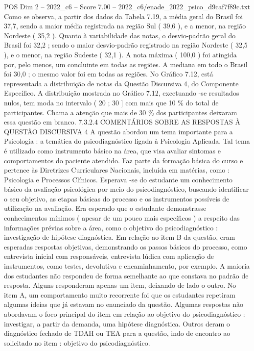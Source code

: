 \begin{textsample}{POS Dim 2 – 2022\_c6 – Score 7.00 – 2022\_c6/enade\_2022\_psico\_d9caf7f89c.txt}
Como se observa, a partir dos dados da Tabela 7.19, a média geral do Brasil foi 37,7, sendo a maior média registrada na região Sul ( 39,6 ), e a menor, na região Nordeste ( 35,2 ).
Quanto à variabilidade das notas, o desvio-padrão geral do Brasil foi 32,2 ; sendo o maior desvio-padrão registrado na região Nordeste ( 32,5 ), e o menor, na região Sudeste ( 32,1 ).
A nota máxima ( 100,0 ) foi atingida por, pelo menos, um concluinte em todas as regiões.
A mediana em todo o Brasil foi 30,0 ; o mesmo valor foi em todas as regiões.
No Gráfico 7.12, está representada a distribuição de notas da Questão Discursiva 4, do Componente Específico.
A distribuição mostrada no Gráfico 7.12, excetuando -se resultados nulos, tem moda no intervalo ( 20 ; 30 ] com mais que 10 \% do total de participantes.
Chama a atenção que mais de 30 \% dos participantes deixaram essa questão em branco. 7.3.2.4 COMENTÁRIOS SOBRE AS RESPOSTAS À QUESTÃO DISCURSIVA 4 A questão abordou um tema importante para a Psicologia : a temática do psicodiagnóstico ligada à Psicologia Aplicada.
Tal tema é utilizado como instrumento básico na área, que visa avaliar sintomas e comportamentos do paciente atendido.
Faz parte da formação básica do curso e pertence às Diretrizes Curriculares Nacionais, incluída em matérias, como : Psicologia e Processos Clínicos.
Esperava -se do estudante um conhecimento básico da avaliação psicológica por meio do psicodiagnóstico, buscando identificar o seu objetivo, as etapas básicas do processo e os instrumentos possíveis de utilização na avaliação.
Era esperado que o estudante demonstrasse conhecimentos mínimos ( apesar de um pouco mais específicos ) a respeito das informações prévias sobre a área, como o objetivo do psicodiagnóstico : investigação de hipótese diagnóstica.
Em relação ao item B da questão, eram esperadas respostas objetivas, demonstrando os passos básicos do processo, como entrevista inicial com responsáveis, entrevista lúdica com aplicação de instrumentos, como testes, devolutiva e encaminhamento, por exemplo.
A maioria dos estudantes não respondeu de forma semelhante ao que constava no padrão de resposta.
Alguns responderam apenas um item, deixando de lado o outro.
No item A, um comportamento muito recorrente foi que os estudantes repetiram algumas ideias que já estavam no enunciado da questão.
Algumas respostas não abordavam o foco principal do item em relação ao objetivo do psicodiagnóstico : investigar, a partir da demanda, uma hipótese diagnóstica.
Outros deram o diagnóstico fechado de TDAH ou TEA para a questão, indo de encontro ao solicitado no item : objetivo do psicodiagnóstico.

\end{textsample}
